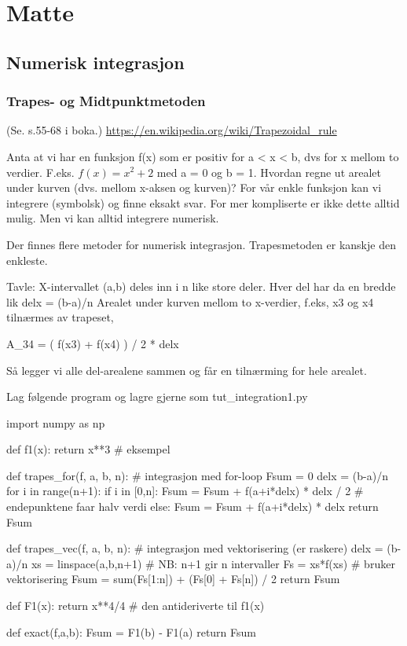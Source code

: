 \chapter{Matte}

\section{Numerisk integrasjon}

\subsection{Trapes- og Midtpunktmetoden}
(Se. s.55-68 i boka.) 
\url{https://en.wikipedia.org/wiki/Trapezoidal_rule}

Anta at vi har en funksjon f(x) som er positiv for a < x < b, dvs for x mellom to verdier. F.eks. $f(x) = x^2+2$ med a = 0 og b = 1. Hvordan regne ut arealet under kurven (dvs. mellom x-aksen og kurven)? For vår enkle funksjon kan vi integrere (symbolsk) og finne eksakt svar. For mer kompliserte er ikke dette alltid mulig. Men vi kan alltid integrere numerisk.

Der finnes flere metoder for numerisk integrasjon. Trapesmetoden er kanskje den enkleste. 

Tavle: 
X-intervallet (a,b) deles inn i n like store deler.
Hver del har da en bredde lik delx = (b-a)/n
Arealet under kurven mellom to x-verdier, f.eks, x3 og x4 tilnærmes av trapeset,
\begin{usncodebox}
A_34 = ( f(x3) + f(x4) ) / 2 * delx
\end{usncodebox}
Så legger vi alle del-arealene sammen og får en tilnærming for hele arealet. 

Lag følgende program og lagre gjerne som tut\_{}integration1.py 

\begin{usncodebox}
import numpy as np

def f1(x):
    return x**3   # eksempel

def trapes_for(f, a, b, n):  # integrasjon med for-loop
    Fsum = 0
    delx = (b-a)/n
    for i in range(n+1):
        if i in [0,n]:
           Fsum = Fsum + f(a+i*delx) * delx / 2  # endepunktene faar halv verdi
        else: 
           Fsum = Fsum + f(a+i*delx) * delx
    return Fsum


def trapes_vec(f, a, b, n):  # integrasjon med vektorisering (er raskere)
    delx = (b-a)/n
    xs = linspace(a,b,n+1)   # NB: n+1 gir n intervaller
    Fs = xs*f(xs)   # bruker vektorisering
    Fsum = sum(Fs[1:n]) + (Fs[0] + Fs[n]) / 2
    return Fsum 


def F1(x):    
    return x**4/4    # den antideriverte til f1(x)

def exact(f,a,b):
    Fsum = F1(b) - F1(a)
    return Fsum
\end{usncodebox}

